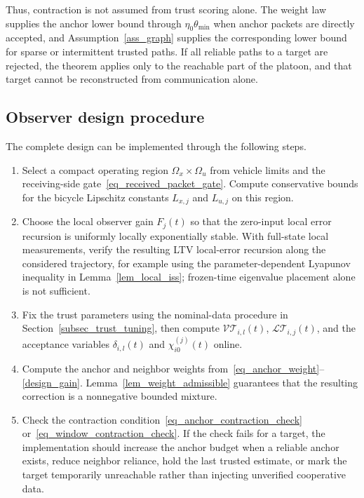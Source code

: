 \documentclass[letterpaper,journal]{IEEEtran}
\def\LT{\mathcal{LT}} %
\def\VT{\mathcal{VT}} %
\begin{document}
Thus, contraction is not assumed from trust scoring alone. The weight law supplies the anchor lower bound through $\eta_0\theta_{\min}$ when anchor packets are directly accepted, and Assumption~\ref{ass_graph} supplies the corresponding lower bound for sparse or intermittent trusted paths. If all reliable paths to a target are rejected, the theorem applies only to the reachable part of the platoon, and that target cannot be reconstructed from communication alone.

\subsection{Observer design procedure}
The complete design can be implemented through the following steps.
\begin{enumerate}
    \item Select a compact operating region $\Omega_x\times\Omega_u$ from vehicle limits and the receiving-side gate~\eqref{eq_received_packet_gate}. Compute conservative bounds for the bicycle Lipschitz constants $L_{x,j}$ and $L_{u,j}$ on this region.
    \item Choose the local observer gain $F_j(t)$ so that the zero-input local error recursion is uniformly locally exponentially stable. With full-state local measurements, verify the resulting LTV local-error recursion along the considered trajectory, for example using the parameter-dependent Lyapunov inequality in Lemma~\ref{lem_local_iss}; frozen-time eigenvalue placement alone is not sufficient.
    \item Fix the trust parameters using the nominal-data procedure in Section~\ref{subsec_trust_tuning}, then compute $\VT_{i,l}(t)$, $\LT_{i,j}(t)$, and the acceptance variables $\delta_{i,l}(t)$ and $\chi_{i0}^{(j)}(t)$ online.
    \item Compute the anchor and neighbor weights from~\eqref{eq_anchor_weight}--\eqref{design_gain}. Lemma~\ref{lem_weight_admissible} guarantees that the resulting correction is a nonnegative bounded mixture.
    \item Check the contraction condition~\eqref{eq_anchor_contraction_check} or~\eqref{eq_window_contraction_check}. If the check fails for a target, the implementation should increase the anchor budget when a reliable anchor exists, reduce neighbor reliance, hold the last trusted estimate, or mark the target temporarily unreachable rather than injecting unverified cooperative data.
\end{enumerate}
\end{document}
